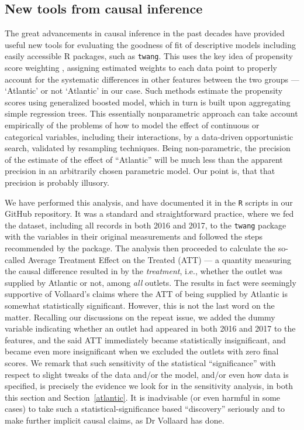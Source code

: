 \documentclass[alpha-refs]{wiley-article}
\begin{document}
\subsection{New tools from causal inference}


The great advancements in causal inference in the past decades have provided useful new tools for evaluating the goodness of fit of descriptive models including easily accessible R packages, such as \texttt{twang}. 
This uses the key idea of propensity score weighting \citep{mccaffrey2004propensity}, assigning estimated weights to each data point to properly account for the systematic differences in other features between the two groups --- `Atlantic' or not `Atlantic' in our case. 
Such methods estimate the propensity scores using generalized boosted model, which in turn is built upon aggregating simple regression trees.  This essentially nonparametric approach can take account empirically of the problems of how to model the effect of continuous or categorical variables, including their interactions, by a data-driven opportunistic search, validated by resampling techniques.  Being non-parametric, the precision of the estimate of the effect of ``Atlantic'' will be much less than the apparent precision in an arbitrarily chosen parametric model. Our point is, that that precision is probably illusory.

We have performed this analysis, and have documented it in the \texttt{R} scripts in our GitHub repository.  It was a standard and straightforward practice, where we fed the dataset, including all records in both 2016 and 2017, to the \texttt{twang} package with the variables in their original measurements and followed the steps recommended by the package. 
The analysis then proceeded to calculate the so-called Average Treatment Effect on the Treated (ATT) --- a quantity measuring the causal difference resulted in by the \textit{treatment}, i.e., whether the outlet was supplied by Atlantic or not, among \textit{all} outlets.  The results in fact were seemingly supportive of Vollaard's claims where the ATT of being supplied by Atlantic is somewhat statistically significant.  However, this is not the last word on the matter.  Recalling our discussions on the repeat issue, we added the dummy variable indicating whether an outlet had appeared in both 2016 and 2017 to the features, and the said ATT immediately became statistically insignificant,  and became even more insignificant when we excluded the outlets with zero final scores. 
{We remark that such sensitivity of the statistical ``significance'' with respect to slight tweaks of the data and/or the model, and/or even how data is specified, is precisely the evidence we look for in the sensitivity analysis, in both this section and Section~\ref{atlantic}.  It is inadvisable (or even harmful in some cases) to take such a statistical-significance based ``discovery'' seriously and to make further implicit causal claims, as Dr Vollaard has done.}
\end{document}
